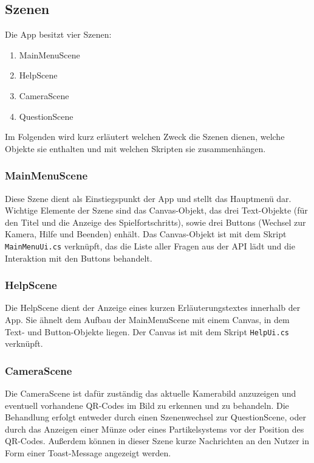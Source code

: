 \subsection{Szenen}
\label{sec:Szenen}
Die App besitzt vier Szenen:

\begin{enumerate}
  \item MainMenuScene
  \item HelpScene
  \item CameraScene
  \item QuestionScene
\end{enumerate}

Im Folgenden wird kurz erläutert welchen Zweck die Szenen dienen, welche Objekte sie enthalten und mit welchen Skripten sie zusammenhängen.

\subsubsection{MainMenuScene}
\label{subs:MainMenuScene}
Diese Szene dient als Einstiegspunkt der App und stellt das Hauptmenü dar. Wichtige Elemente der Szene sind das Canvas-Objekt, das drei Text-Objekte (für den Titel und die Anzeige des Spielfortschritts), sowie drei Buttons (Wechsel zur Kamera, Hilfe und Beenden) enhält. Das Canvas-Objekt ist mit dem Skript \texttt{MainMenuUi.cs} verknüpft, das die Liste aller Fragen aus der API lädt und die Interaktion mit den Buttons behandelt.

\subsubsection{HelpScene}
\label{subs:HelpScene}
Die HelpScene dient der Anzeige eines kurzen Erläuterungstextes innerhalb der App. Sie ähnelt dem Aufbau der MainMenuScene mit einem Canvas, in dem Text- und Button-Objekte liegen. Der Canvas ist mit dem Skript \texttt{HelpUi.cs} verknüpft.

\subsubsection{CameraScene}
\label{subs:CameraScene}
Die CameraScene ist dafür zuständig das aktuelle Kamerabild anzuzeigen und eventuell vorhandene QR-Codes im Bild zu erkennen und zu behandeln. Die Behandlung erfolgt entweder durch einen Szenenwechsel zur QuestionScene, oder durch das Anzeigen einer Münze oder eines Partikelsystems vor der Position des QR-Codes. Außerdem können in dieser Szene kurze Nachrichten an den Nutzer in Form einer Toast-Message angezeigt werden.

